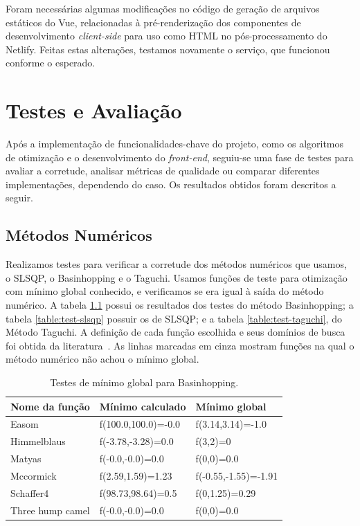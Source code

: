 \documentclass[]{politex}
\begin{document}
Foram necessárias algumas modificações no código de geração de arquivos
estáticos do Vue, relacionadas à pré-renderização dos componentes de
desenvolvimento \textit{client-side} para uso como HTML no pós-processamento
do Netlify. Feitas estas alterações, testamos novamente o serviço, que funcionou
conforme o esperado.

\chapter{Testes e Avaliação}

Após a implementação de funcionalidades-chave do projeto, como os algoritmos de
otimização e o desenvolvimento do \textit{front-end}, seguiu-se uma fase de
testes para avaliar a corretude, analisar métricas de qualidade ou comparar
diferentes implementações, dependendo do caso. Os resultados obtidos foram
descritos a seguir.

\section{Métodos Numéricos}
Realizamos testes para verificar a corretude dos métodos numéricos que usamos,
o SLSQP, o Basinhopping e o Taguchi. Usamos funções de teste para otimização
com mínimo global conhecido, e verificamos se era igual à saída do método
numérico. A tabela \ref{table:test-bh} possui os resultados dos testes do método
Basinhopping; a tabela \ref{table:test-slsqp} possuir os de SLSQP; e a tabela
\ref{table:test-taguchi}, do Método Taguchi. A definição de cada função escolhida e
seus domínios de busca foi obtida da literatura~\cite{optimization-functions}.
As linhas marcadas em cinza mostram funções na qual o método numérico não achou
o mínimo global.

\begin{table}[H]
\centering
\begin{tabular}{l|l|l}
 Nome da função & Mínimo calculado & Mínimo global \\ \hline
\rowcolor{Gray}
Easom  &  f(100.0,100.0)=-0.0  &  f(3.14,3.14)=-1.0 \\
Himmelblaus  &  f(-3.78,-3.28)=0.0  &  f(3,2)=0 \\
Matyas  &  f(-0.0,-0.0)=0.0  &  f(0,0)=0.0 \\
\rowcolor{Gray}
Mccormick  &  f(2.59,1.59)=1.23  &  f(-0.55,-1.55)=-1.91 \\
\rowcolor{Gray}
Schaffer4  &  f(98.73,98.64)=0.5  &  f(0,1.25)=0.29 \\
Three hump camel  &  f(-0.0,-0.0)=0.0  &  f(0,0)=0.0 \\
\end{tabular}
\caption{Testes de mínimo global para Basinhopping.}
\label{table:test-bh}
\end{table}
\end{document}
